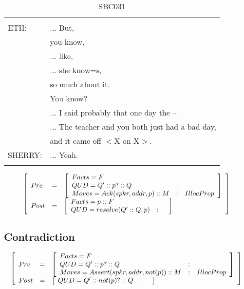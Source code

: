 \documentclass[11pt]{article}
\newenvironment{sbcquote}[2]
{
	\def\savedcaption{\caption{#1}}%
	\def\savedlabel{\label{#2}}%
	\begin{table}[h]
		\centering
		\begin{small}
		\begin{tabular}{ll}
			\hline
			& \\
}
{
	& \\
	\hline
	\end{tabular}
	\end{small}
	\savedcaption
	\savedlabel
\end{table}
}
\newenvironment{recenv}
{\left[\begin{array}{lll}}
{\end{array}\right]}
\begin{document}
			\begin{sbcquote}{SBC031}
				BETH:&	... But,\\
				&you know,\\
				&... like,\\
				&... she know=s,\\
				&so much about it.\\
				&You know?\\
				&... I said probably that one day the --\\
				&... The teacher and you both just had a bad day,\\
				&and it came off $<$X on X$>$.\\
				SHERRY:&	... Yeah.\\
			\end{sbcquote}
			\begin{equation*}
			\begin{recenv}
			Pre  &=& \begin{recenv}
			Facts = F\\
			QUD = Q' :: p? :: Q &:& \\
			Moves = Ack(spkr, addr, p) :: M &:& IllocProp
			\end{recenv}\\
			Post &=& \begin{recenv}
			Facts = p :: F\\
			QUD = resolve(Q' :: Q, p) &:& 
			\end{recenv}
			\end{recenv}
			\end{equation*}
		\subsection{Contradiction}
			\begin{equation*}
			\begin{recenv}
			Pre  &=& \begin{recenv}
			Facts = F\\
			QUD = Q' :: p? :: Q &:& \\
			Moves = Assert(spkr, addr, not(p)) :: M &:& IllocProp
			\end{recenv}\\
			Post &=& \begin{recenv}
			QUD = Q' :: not(p)? :: Q &:& 
			\end{recenv}
			\end{recenv}
			\end{equation*}
			
\end{document}
